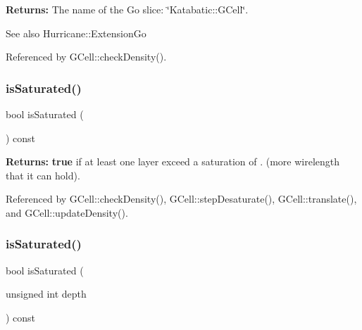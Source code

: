 {\bfseries Returns\+:} The name of the Go slice\+: {\ttfamily \char`\"{}\+Katabatic\+::\+G\+Cell\char`\"{}}.

\begin{DoxySeeAlso}{See also}
Hurricane\+::\+Extension\+Go 
\end{DoxySeeAlso}


Referenced by G\+Cell\+::check\+Density().

\mbox{\label{classKatabatic_1_1GCell_a9f274f17cf9166e997d306b120618fdf}} 
\subsubsection{\texorpdfstring{is\+Saturated()}{isSaturated()}\hspace{0.1cm}{\footnotesize\ttfamily [1/2]}}
{\footnotesize\ttfamily bool is\+Saturated (\begin{DoxyParamCaption}{ }\end{DoxyParamCaption}) const\hspace{0.3cm}{\ttfamily [inline]}}

{\bfseries Returns\+:} {\bfseries true} if at least one layer exceed a saturation of {.} (more wirelength that it can hold). 

Referenced by G\+Cell\+::check\+Density(), G\+Cell\+::step\+Desaturate(), G\+Cell\+::translate(), and G\+Cell\+::update\+Density().

\mbox{\label{classKatabatic_1_1GCell_a49b7bd2f05abd94436177558fd0f97d8}} 
\subsubsection{\texorpdfstring{is\+Saturated()}{isSaturated()}\hspace{0.1cm}{\footnotesize\ttfamily [2/2]}}
{\footnotesize\ttfamily bool is\+Saturated (\begin{DoxyParamCaption}\item[{unsigned int}]{depth }\end{DoxyParamCaption}) const}


